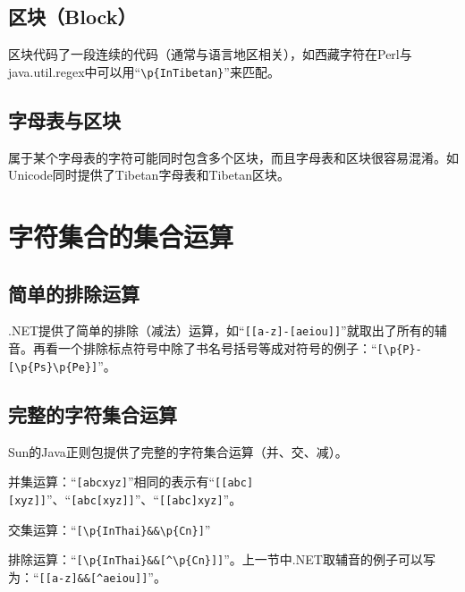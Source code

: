 \subsection{区块（Block）}

区块代码了一段连续的代码（通常与语言地区相关），如西藏字符在Perl与java.util.regex中可以用“\verb|\p{InTibetan}|”来匹配。

\subsection{字母表与区块}

属于某个字母表的字符可能同时包含多个区块，而且字母表和区块很容易混淆。如Unicode同时提供了Tibetan字母表和Tibetan区块。



\section{字符集合的集合运算}

\subsection{简单的排除运算}

.NET提供了简单的排除（减法）运算，如“\verb|[[a-z]-[aeiou]]|”就取出了所有的辅音。再看一个排除标点符号中除了书名号括号等成对符号的例子：“\verb|[\p{P}-[\p{Ps}\p{Pe}]|”。

\subsection{完整的字符集合运算}

Sun的Java正则包提供了完整的字符集合运算（并、交、减）。

并集运算：“\verb|[abcxyz]|”相同的表示有“\verb|[[abc][xyz]]|”、“\verb|[abc[xyz]]|”、“\verb|[[abc]xyz]|”。

交集运算：“\verb|[\p{InThai}&&\p{Cn}]|”

排除运算：“\verb|[\p{InThai}&&[^\p{Cn}]]|”。上一节中.NET取辅音的例子可以写为：“\verb|[[a-z]&&[^aeiou]]|”。






